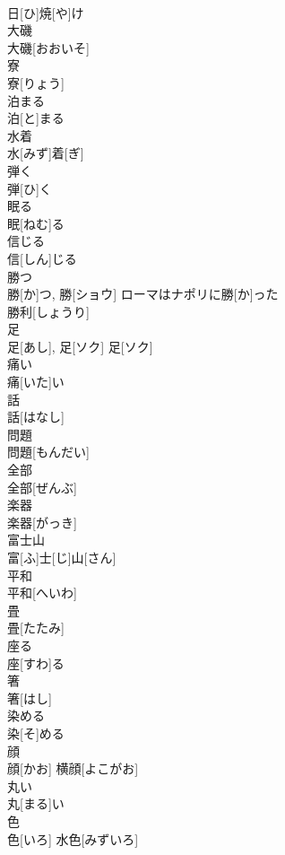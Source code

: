\documentclass[8pt]{extreport}
\begin{document}
\begin{CJK}{UTF8}{min}
\\	日[ひ]焼[や]け	
\\	大磯	
\\	大磯[おおいそ]	
\\	寮	
\\	寮[りょう]	
\\	泊まる	
\\	泊[と]まる	
\\	水着	
\\	水[みず]着[ぎ]	
\\	弾く	
\\	弾[ひ]く	
\\	眠る	
\\	眠[ねむ]る	
\\	信じる	
\\	信[しん]じる	
\\	勝つ	
\\	勝[か]つ, 勝[ショウ]	ローマはナポリに勝[か]った
\\	勝利[しょうり] 
\\	足	
\\	足[あし], 足[ソク]	足[ソク] 
\\	痛い	
\\	痛[いた]い	
\\	話	
\\	話[はなし]	
\\	問題	
\\	問題[もんだい]	
\\	全部	
\\	全部[ぜんぶ]	
\\	楽器	
\\	楽器[がっき]	
\\	富士山	
\\	富[ふ]士[じ]山[さん]	
\\	平和	
\\	平和[へいわ]	
\\	畳	
\\	畳[たたみ]	
\\	座る	
\\	座[すわ]る	
\\	箸	
\\	箸[はし]	
\\	染める	
\\	染[そ]める	
\\	顔	
\\	顔[かお]	横顔[よこがお] 
\\	丸い	
\\	丸[まる]い	
\\	色	
\\	色[いろ]	水色[みずいろ] 

\end{CJK}
\end{document}
